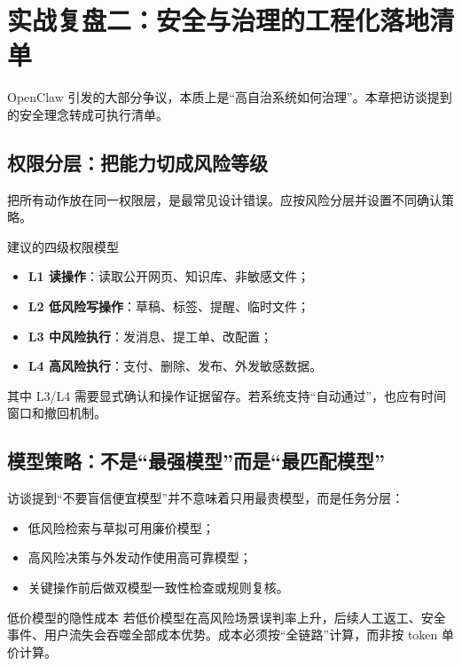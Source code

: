 \section{实战复盘二：安全与治理的工程化落地清单}

OpenClaw 引发的大部分争议，本质上是“高自治系统如何治理”。本章把访谈提到的安全理念转成可执行清单。

\subsection{权限分层：把能力切成风险等级}

把所有动作放在同一权限层，是最常见设计错误。应按风险分层并设置不同确认策略。

\begin{knowledgebox}{建议的四级权限模型}
\begin{itemize}
    \item \textbf{L1 读操作}：读取公开网页、知识库、非敏感文件；
    \item \textbf{L2 低风险写操作}：草稿、标签、提醒、临时文件；
    \item \textbf{L3 中风险执行}：发消息、提工单、改配置；
    \item \textbf{L4 高风险执行}：支付、删除、发布、外发敏感数据。
\end{itemize}
\end{knowledgebox}

其中 L3/L4 需要显式确认和操作证据留存。若系统支持“自动通过”，也应有时间窗口和撤回机制。

\subsection{模型策略：不是“最强模型”而是“最匹配模型”}

访谈提到“不要盲信便宜模型”并不意味着只用最贵模型，而是任务分层：
\begin{itemize}
    \item 低风险检索与草拟可用廉价模型；
    \item 高风险决策与外发动作使用高可靠模型；
    \item 关键操作前后做双模型一致性检查或规则复核。
\end{itemize}

\begin{warningbox}{低价模型的隐性成本}
若低价模型在高风险场景误判率上升，后续人工返工、安全事件、用户流失会吞噬全部成本优势。成本必须按“全链路”计算，而非按 token 单价计算。
\end{warningbox}

